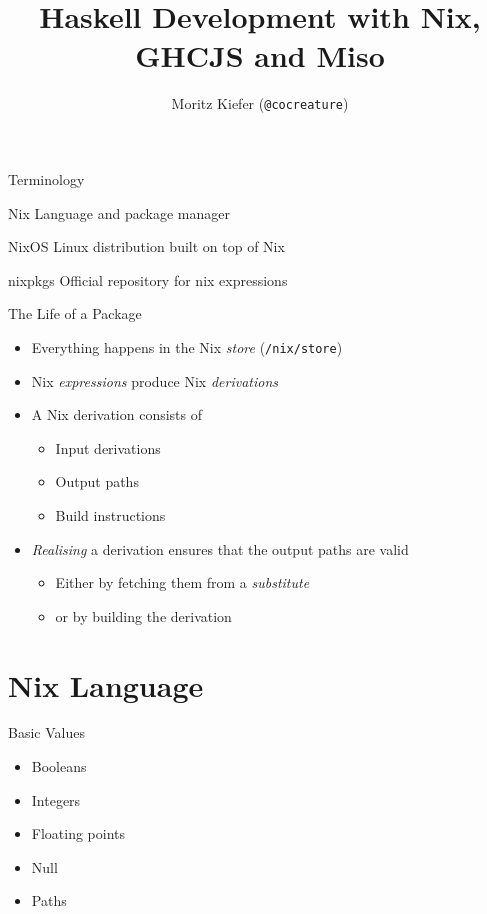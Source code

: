 \documentclass{beamer}
\title{Haskell Development with Nix, GHCJS and Miso}
\date{\DTMdisplaydate{2018}{07}{09}{}}
\author{Moritz Kiefer (\texttt{@cocreature})}
\begin{document}
\maketitle

\begin{frame}{Terminology}
  \begin{block}{Nix}
    Language and package manager
  \end{block}
  \begin{block}{NixOS}
    Linux distribution built on top of Nix
  \end{block}
  \begin{block}{nixpkgs}
    Official repository for nix expressions
  \end{block}
\end{frame}

\begin{frame}{The Life of a Package}
  \begin{itemize}
  \item Everything happens in the Nix \emph{store} (\texttt{/nix/store})
  \item Nix \emph{expressions} produce Nix \emph{derivations}
  \item A Nix derivation consists of
    \begin{itemize}
    \item Input derivations
    \item Output paths
    \item Build instructions
    \end{itemize}
  \item \emph{Realising} a derivation ensures that the output paths are valid
    \begin{itemize}
    \item Either by fetching them from a \emph{substitute}
    \item or by building the derivation
    \end{itemize}
  \end{itemize}
\end{frame}

\section{Nix Language}
\begin{frame}{Basic Values}
  \begin{itemize}
  \item Booleans
  \item Integers
  \item Floating points
  \item Null
  \item Paths
  \end{itemize}
\end{frame}
\end{document}
